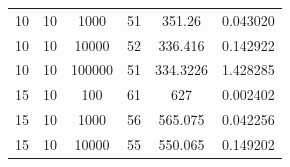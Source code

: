 \documentclass[11pt,a4paper]{report}
\begin{document}
\begin{table}[H]
{\begin{tabular}{c|c|c|c|c|c}
10                                                                                   & 10                                                                                     & 1000                                                                      & 51                                                                                        & 351.26                                                                    & 0.043020              \\
10                                                                                   & 10                                                                                     & 10000                                                                     & 52                                                                                        & 336.416                                                                   & 0.142922              \\
10                                                                                   & 10                                                                                     & 100000                                                                    & 51                                                                                        & 334.3226                                                                  & 1.428285              \\ \hline
15                                                                                   & 10                                                                                     & 100                                                                       & 61                                                                                        & 627                                                                       & 0.002402              \\
15                                                                                   & 10                                                                                     & 1000                                                                      & 56                                                                                        & 565.075                                                                   & 0.042256              \\
15                                                                                   & 10                                                                                     & 10000                                                                     & 55                                                                                        & 550.065                                                                   & 0.149202              \\

\end{tabular}}
\end{table}
\end{document}
